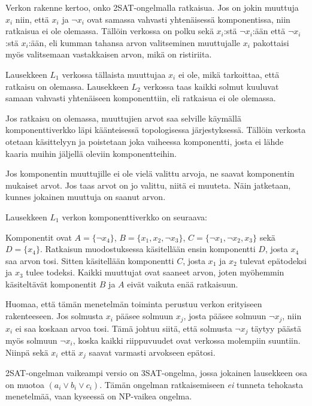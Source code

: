 Verkon rakenne kertoo, onko 2SAT-ongelmalla ratkaisua.
Jos on jokin muuttuja $x_i$ niin,
että $x_i$ ja $\lnot x_i$ ovat samassa
vahvasti yhtenäisessä komponentissa,
niin ratkaisua ei ole olemassa.
Tällöin verkossa on polku sekä $x_i$:stä
$\lnot x_i$:ään että $\lnot x_i$:stä $x_i$:ään,
eli kumman tahansa arvon valitseminen
muuttujalle $x_i$ pakottaisi myös valitsemaan
vastakkaisen arvon, mikä on ristiriita.

Lausekkeen $L_1$ verkossa tällaista
muuttujaa $x_i$ ei ole,
mikä tarkoittaa, että ratkaisu on olemassa.
Lausekkeen $L_2$ verkossa taas kaikki solmut
kuuluvat samaan vahvasti yhtenäiseen komponenttiin,
eli ratkaisua ei ole olemassa.

Jos ratkaisu on olemassa, muuttujien arvot saa selville
käymällä komponenttiverkko läpi käänteisessä
topologisessa järjestyksessä.
Tällöin verkosta otetaan käsittelyyn ja poistetaan
joka vaiheessa komponentti,
josta ei lähde kaaria muihin jäljellä
oleviin komponentteihin.

Jos komponentin muuttujille ei ole vielä valittu arvoja,
ne saavat komponentin mukaiset arvot.
Jos taas arvot on jo valittu, niitä ei muuteta.
Näin jatketaan, kunnes jokainen muuttuja on saanut arvon.

Lausekkeen $L_1$ verkon komponenttiverkko on seuraava:
\\
\begin{center}
\end{center}

Komponentit ovat
$A = \{\lnot x_4\}$,
$B = \{x_1, x_2, \lnot x_3\}$,
$C = \{\lnot x_1, \lnot x_2, x_3\}$ sekä
$D = \{x_4\}$.
Ratkaisun muodostuksessa
käsitellään ensin komponentti $D$,
josta $x_4$ saa arvon tosi.
Sitten käsitellään komponentti $C$,
josta $x_1$ ja $x_2$ tulevat epätodeksi
ja $x_3$ tulee todeksi.
Kaikki muuttujat ovat saaneet arvon,
joten myöhemmin käsiteltävät
komponentit $B$ ja $A$ eivät vaikuta enää ratkaisuun.

Huomaa, että tämän menetelmän toiminta
perustuu verkon erityiseen rakenteeseen.
Jos solmusta $x_i$ pääsee
solmuun $x_j$,
josta pääsee solmuun $\lnot x_j$,
niin $x_i$ ei saa koskaan arvoa tosi.
Tämä johtuu siitä, että
solmusta $\lnot x_j$ täytyy
päästä myös solmuun $\lnot x_i$,
koska kaikki riippuvuudet
ovat verkossa molempiin suuntiin.
Niinpä sekä $x_i$ että $x_j$
saavat varmasti arvokseen epätosi.

2SAT-ongelman vaikeampi versio on 3SAT-ongelma,
jossa jokainen lausekkeen osa on muotoa
$(a_i \lor b_i \lor c_i)$.
Tämän ongelman ratkaisemiseen \textit{ei}
tunneta tehokasta menetelmää,
vaan kyseessä on NP-vaikea ongelma.


